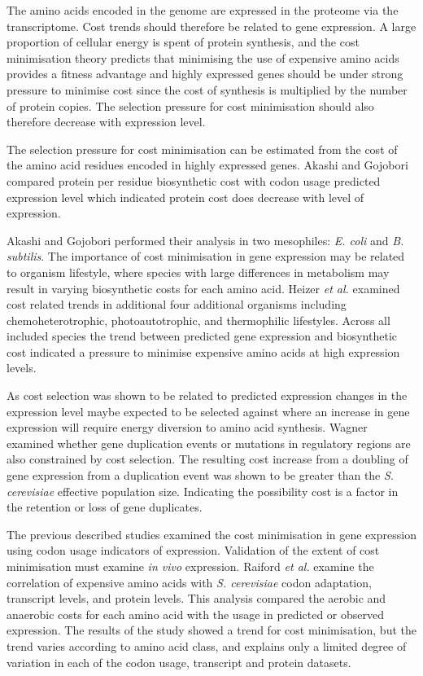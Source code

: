 The amino acids encoded in the genome are expressed in the proteome via the transcriptome. Cost trends should therefore be related to gene expression. A large proportion of cellular energy is spent of protein synthesis, and the cost minimisation theory predicts that minimising the use of expensive amino acids provides a fitness advantage and highly expressed genes should be under strong pressure to minimise cost since the cost of synthesis is multiplied by the number of protein copies. The selection pressure for cost minimisation should also therefore decrease with expression level.

The selection pressure for cost minimisation can be estimated from the cost of the amino acid residues encoded in highly expressed genes. Akashi and Gojobori \cite{akashi2002} compared protein per residue biosynthetic cost with codon usage predicted expression level \cite{kanaya1999} which indicated protein cost does decrease with level of expression.

Akashi and Gojobori performed their analysis in two mesophiles: \emph{E. coli} and \emph{B. subtilis}. The importance of cost minimisation in gene expression may be related to organism lifestyle, where species with large differences in metabolism may result in varying biosynthetic costs for each amino acid. Heizer \emph{et al.} \cite{heizer2006} examined cost related trends in additional four additional organisms including chemoheterotrophic, photoautotrophic, and thermophilic lifestyles. Across all included species the trend between predicted gene expression and biosynthetic cost indicated a pressure to minimise expensive amino acids at high expression levels.



As cost selection was shown to be related to predicted expression changes in the expression level maybe expected to be selected against where an increase in gene expression will require energy diversion to amino acid synthesis. Wagner \cite{wagner2005} examined whether gene duplication events or mutations in regulatory regions are also constrained by cost selection. The resulting cost increase from a doubling of gene expression from a duplication event was shown to be greater than the \emph{S. cerevisiae} effective population size. Indicating the possibility cost is a factor in the retention or loss of gene duplicates.

The previous described studies examined the cost minimisation in gene expression using codon usage indicators of expression. Validation of the extent of cost minimisation must examine \emph{in vivo} expression. Raiford \emph{et al.} \cite{raiford2008} examine the correlation of expensive amino acids with \emph{S. cerevisiae} codon adaptation, transcript levels, and protein levels. This analysis compared the aerobic and anaerobic costs for each amino acid with the usage in predicted or observed expression. The results of the study showed a trend for cost minimisation, but the trend varies according to amino acid class, and explains only a limited degree of variation in each of the codon usage, transcript and protein datasets.

